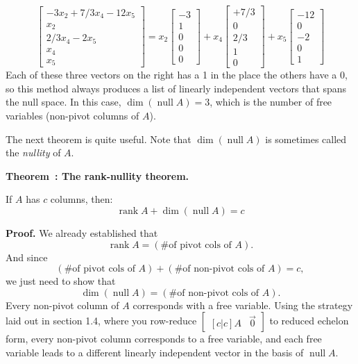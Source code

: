\documentclass[11pt, letterpaper]{report}
\newenvironment{notes}{}{}
\newenvironment{book}{}{}
\newcounter{theorem}[chapter]
\newenvironment{theorem}[1][]{\refstepcounter{theorem}\begin{bbox}\par
    \noindent\textbf{Theorem~\thetheorem: #1}}{\end{bbox}}
\newlength\oldfboxsep%
\newlength\myminiwidth%
\newenvironment{bbox}{%
  \setlength\oldfboxsep\fboxsep
  \setlength{\fboxsep}{.1in}%
  \setlength\myminiwidth\linewidth%
  \addtolength\myminiwidth{-0.2in}%
  \vspace{0.1in}%
  \begin{lrbox}{\bboxbox}\begin{minipage}{\myminiwidth}%
    }{%
    \end{minipage}\end{lrbox}%
  \noindent\fbox{\usebox{\bboxbox}}\vspace{0.1in}\setlength\fboxsep\oldfboxsep%
}
\DeclareMathOperator{\nul}{null}
\DeclareMathOperator{\rank}{rank}
\begin{document}
\begin{book}
\[\begin{bmatrix}
-3x_2+7/3x_4-12x_5 \\ x_2 \\ 2/3x_4-2x_5 \\ x_4 \\ x_5
\end{bmatrix}=x_2\begin{bmatrix}
-3 \\ 1 \\ 0 \\ 0 \\ 0
\end{bmatrix}+x_4\begin{bmatrix}
+7/3 \\ 0 \\ 2/3 \\ 1 \\ 0
\end{bmatrix}+x_5\begin{bmatrix}
-12 \\ 0 \\ -2 \\ 0 \\1
\end{bmatrix}\]
Each of these three vectors on the right has a 1 in the place the others have a 0, so this method always produces a list of linearly independent vectors that spans the null space. In this case, $\dim(\nul A) = 3$, which is the number of free variables (non-pivot columns of $A$). \blacksquare

\end{book}

The next theorem is quite useful.
Note that $\dim(\nul A)$ is sometimes called the \emph{nullity} of $A$.

\begin{theorem}[The rank-nullity theorem.]
\label{theorem:rank-nullity}

If $A$ has $c$ columns, then: \[\rank A + \dim(\nul A) = c\]

\end{theorem}

\begin{notes}
\vfill
\newpage
\end{notes}

\begin{book}
\textbf{Proof.} We already established that \[\rank A = (\text{\# of pivot cols of }A).\] And since 
\[(\text{\# of pivot cols of }A) + (\text{\# of non-pivot cols of }A) = c,\]
we just need to show that \[\dim(\nul A) = (\text{\# of non-pivot cols of }A).\]
Every non-pivot column of $A$ corresponds with a free variable. Using the strategy laid out in section 1.4, where you row-reduce $\begin{bmatrix}[c|c]
A & \vec{0}
\end{bmatrix}$ to reduced echelon form, every non-pivot column corresponds to a free variable, and each free variable leads to a different linearly independent vector in the basis of $\nul A$. \blacksquare
\end{book}
\end{document}
